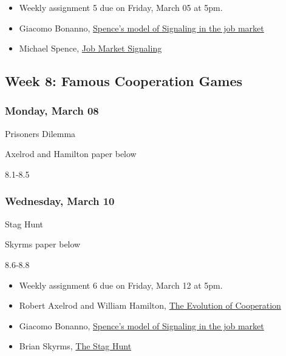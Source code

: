 \documentclass[
]{article}
\providecommand{\tightlist}{%
  \setlength{\itemsep}{0pt}\setlength{\parskip}{0pt}}
\begin{document}
\begin{itemize}
\tightlist
\item
  Weekly assignment 5 due on Friday, March 05 at 5pm.
\item
  Giacomo Bonanno,
  \href{http://faculty.econ.ucdavis.edu/faculty/bonanno/teaching/200C/Signaling.pdf}{Spence's
  model of Signaling in the job market}
\item
  Michael Spence, \href{https://www.jstor.org/stable/1882010?seq=1}{Job
  Market Signaling}
\end{itemize}

\hypertarget{week-8-famous-cooperation-games}{%
\subsection{Week 8: Famous Cooperation
Games}\label{week-8-famous-cooperation-games}}

\begin{multicols}{2}

\hypertarget{monday-march-08}{%
\subsubsection{Monday, March 08}\label{monday-march-08}}

\begin{description}
\tightlist
\item[Topic]
Prisoners Dilemma
\item[Reading]
Axelrod and Hamilton paper below
\item[Lectures]
8.1-8.5
\end{description}

\hypertarget{wednesday-march-10}{%
\subsubsection{Wednesday, March 10}\label{wednesday-march-10}}

\begin{description}
\tightlist
\item[Topic]
Stag Hunt
\item[Reading]
Skyrms paper below
\item[Lectures]
8.6-8.8
\end{description}

\end{multicols}

\begin{itemize}
\tightlist
\item
  Weekly assignment 6 due on Friday, March 12 at 5pm.
\item
  Robert Axelrod and William Hamilton,
  \href{http://www-personal.umich.edu/~axe/research/Axelrod\%20and\%20Hamilton\%20EC\%201981.pdf}{The
  Evolution of Cooperation}
\item
  Giacomo Bonanno,
  \href{http://faculty.econ.ucdavis.edu/faculty/bonanno/teaching/200C/Signaling.pdf}{Spence's
  model of Signaling in the job market}
\item
  Brian Skyrms, \href{https://www.jstor.org/stable/3218711}{The Stag
  Hunt}
\end{itemize}
\end{document}

